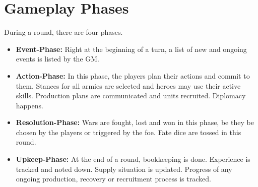 \section{Gameplay Phases}
During a round, there are four phases.
\begin{itemize}
	\item \textbf{Event-Phase:} Right at the beginning of a turn, a list of new and ongoing events is listed by the GM.
	\item \textbf{Action-Phase:} In this phase, the players plan their actions and commit to them. Stances for all armies are selected and heroes may use their active skills. Production plans are communicated and units recruited. Diplomacy happens.
	\item \textbf{Resolution-Phase:} Wars are fought, lost and won in this phase, be they be chosen by the players or triggered by the foe. Fate dice are tossed in this round.
	\item \textbf{Upkeep-Phase:} At the end of a round, bookkeeping is done. Experience is tracked and noted down. Supply situation is updated. Progress of any ongoing production, recovery or recruitment process is tracked.
\end{itemize}